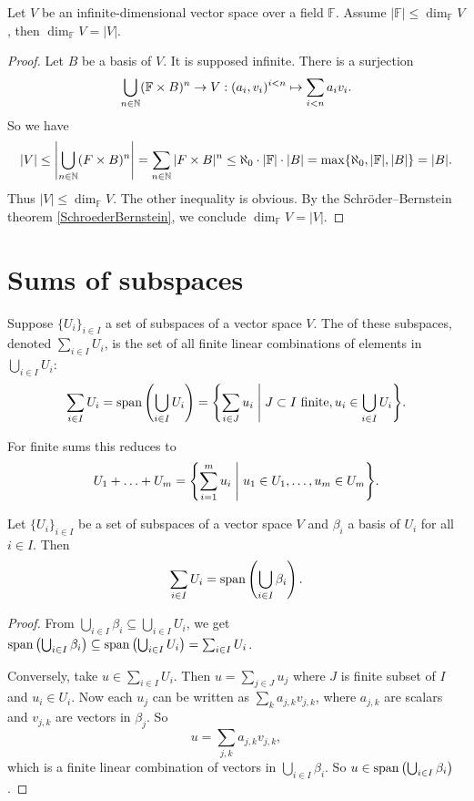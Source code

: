 \begin{lemma}
Let $V$ be an infinite-dimensional vector space over a field $\mathbb{F}$. Assume $|\mathbb{F}|\leq \dim_{\mathbb{F}} V$, then $\dim_{\mathbb{F}} V = |V|$. \label{vsCardinality}
\end{lemma}
\begin{proof}
Let $B$ be a basis of $V$. It is supposed infinite. There is a surjection
\[\bigcup_{n\in\mathbb{N}}(\mathbb{F}\times B)^{n} \to V: (a_i,v_i)^{i<n} \mapsto \sum_{i<n}a_iv_i. \]
So we have
\[ |V| \leq \left|\bigcup_{n\in\mathbb{N}}(F\times B)^{n}\right| = \sum_{n\in \mathbb{N}}|F\times B|^n \leq \aleph_0\cdot |\mathbb{F}| \cdot |B| = \max\{\aleph_0, |\mathbb{F}|, |B|\} = |B|. \]
Thus $|V|\leq \dim_{\mathbb{F}} V$. The other inequality is obvious. By the Schröder–Bernstein theorem \ref{SchroederBernstein}, we conclude $\dim_{\mathbb{F}} V = |V|$.
\end{proof}

\section{Sums of subspaces}
\begin{definition}
Suppose $\{U_i\}_{i\in I}$ a set of subspaces of a vector space $V$. The  of these subspaces, denoted $\sum_{i\in I}U_i$, is the set of all finite linear combinations of elements in $\bigcup_{i\in I}U_i$:
\[ \sum_{i\in I}U_i = \Span\left(\bigcup_{i\in I} U_i\right) = \setbuilder{\sum_{i\in J} u_i}{\text{$J\subset I$ finite}, u_i\in \bigcup_{i\in I}U_i}. \]
\end{definition}
For finite sums this reduces to
\[ U_1+\ldots + U_m = \setbuilder{\sum_{i=1}^m u_i}{u_1\in U_1, \ldots, u_m\in U_m}. \]

\begin{proposition} \label{basisSum}
Let $\{U_i\}_{i\in I}$ be a set of subspaces of a vector space $V$ and $\beta_i$ a basis of $U_i$ for all $i\in I$. Then
\[ \sum_{i\in I}U_i = \operatorname{span}\left(\bigcup_{i\in I}\beta_i\right). \]
\end{proposition}
\begin{proof}
From $\bigcup_{i\in I}\beta_i \subseteq \bigcup_{i\in I} U_i$, we get $\operatorname{span}\left(\bigcup_{i\in I}\beta_i\right) \subseteq \operatorname{span}\left(\bigcup_{i\in I} U_i\right) = \sum_{i\in I}U_i$.

Conversely, take $u\in \sum_{i\in I}U_i$. Then $u = \sum_{j\in J}u_j$ where $J$ is finite subset of $I$ and $u_i\in U_i$. Now each $u_j$ can be written as $\sum_k a_{j,k}v_{j,k}$, where $a_{j,k}$ are scalars and $v_{j,k}$ are vectors in $\beta_j$. So
\[ u = \sum_{j,k}a_{j,k}v_{j,k}, \]
which is a finite linear combination of vectors in $\bigcup_{i\in I}\beta_i$. So $u\in \operatorname{span}\left(\bigcup_{i\in I}\beta_i\right)$.
\end{proof}

